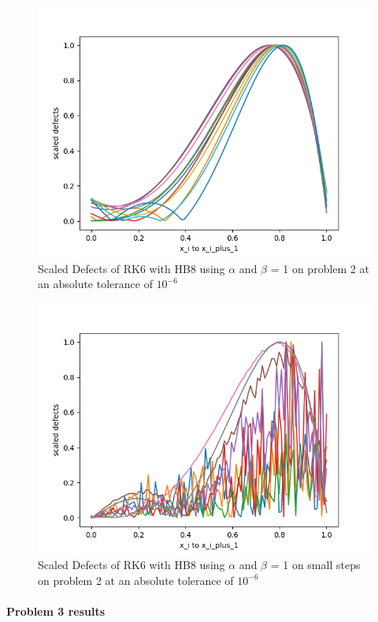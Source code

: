 \documentclass{article}
\begin{document}
\begin{figure}[H]
\centering
\includegraphics[width=0.7\linewidth]{./figures/static_alpha_rk6_with_hb8_p2_scaled_defects}
\caption{Scaled Defects of RK6 with HB8 using $\alpha$ and $\beta$ = 1 on problem 2 at an absolute tolerance of $10^{-6}$}
\label{fig:static_alpha_rk6_with_hb8_p2_scaled_defects}
\end{figure}

\begin{figure}[H]
\centering
\includegraphics[width=0.7\linewidth]{./figures/static_alpha_rk6_with_hb8_p2_scaled_defects_small_steps}
\caption{Scaled Defects of RK6 with HB8 using $\alpha$ and $\beta$ = 1 on small steps on problem 2 at an absolute tolerance of $10^{-6}$}
\label{fig:static_alpha_rk6_with_hb8_p2_scaled_defects_small_steps}
\end{figure}

\paragraph{Problem 3 results}
\end{document}
